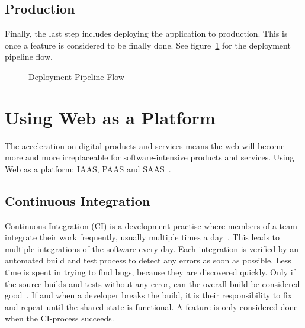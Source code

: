 \documentclass[english]{tktltiki2}
\begin{document}
\subsection{Production}

Finally, the last step includes deploying the application to production. This is once a feature is considered to be finally done. See figure~\ref{figure:deployment-pipeline-flow} for the deployment pipeline flow.

\begin{figure}[h!]

    \vspace{1cm}
    \centering


    \caption{Deployment Pipeline Flow}
    \label{figure:deployment-pipeline-flow}

\end{figure}


\section{Using Web as a Platform}

The acceleration on digital products and services means the web will become more and more irreplaceable for software-intensive products and services. Using Web as a platform: IAAS, PAAS and SAAS~\cite{ZCB10}.

\subsection{Continuous Integration}

Continuous Integration (CI) is a development practise where members of a team integrate their work frequently, usually multiple times a day~\cite{Fow06}. This leads to multiple integrations of the software every day. Each integration is verified by an automated build and test process to detect any errors as soon as possible. Less time is spent in trying to find bugs, because they are discovered quickly. Only if the source builds and tests without any error, can the overall build be considered good~\cite{Fow06}. If and when a developer breaks the build, it is their responsibility to fix and repeat until the shared state is functional. A feature is only considered done when the CI-process succeeds.
\end{document}
